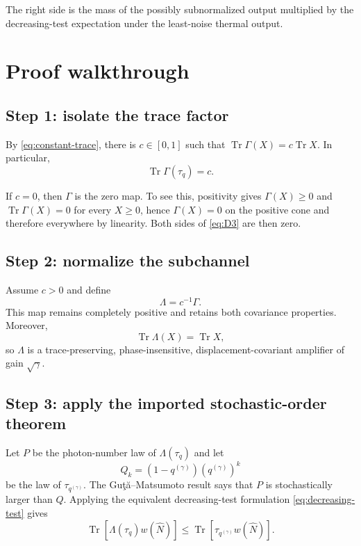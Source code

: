 \documentclass[11pt]{article}
\newcommand{\Tr}{\operatorname{Tr}}
\begin{document}
The right side is the mass of the possibly subnormalized output multiplied
by the decreasing-test expectation under the least-noise thermal output.

\section{Proof walkthrough}

\subsection*{Step 1: isolate the trace factor}

By \eqref{eq:constant-trace}, there is $c\in[0,1]$ such that
$\Tr\Gamma(X)=c\Tr X$.  In particular,
\begin{equation}\label{eq:mass-c}
  \Tr\Gamma(\tau_q)=c.
\end{equation}

If $c=0$, then $\Gamma$ is the zero map.  To see this, positivity gives
$\Gamma(X)\geq0$ and $\Tr\Gamma(X)=0$ for every $X\geq0$, hence
$\Gamma(X)=0$ on the positive cone and therefore everywhere by linearity.
Both sides of \eqref{eq:D3} are then zero.

\subsection*{Step 2: normalize the subchannel}

Assume $c>0$ and define
\[
  \Lambda=c^{-1}\Gamma.
\]
This map remains completely positive and retains both covariance properties.
Moreover,
\[
  \Tr\Lambda(X)=\Tr X,
\]
so $\Lambda$ is a trace-preserving, phase-insensitive,
displacement-covariant amplifier of gain $\sqrt\gamma$.

\subsection*{Step 3: apply the imported stochastic-order theorem}

Let $P$ be the photon-number law of $\Lambda(\tau_q)$ and let
\[
  Q_k=(1-q^{(\gamma)})(q^{(\gamma)})^k
\]
be the law of $\tau_{q^{(\gamma)}}$.  The Gu\c{t}\u{a}--Matsumoto result
says that $P$ is stochastically larger than $Q$.  Applying the equivalent
decreasing-test formulation \eqref{eq:decreasing-test} gives
\begin{equation}\label{eq:normalized-bound}
  \Tr\!\left[\Lambda(\tau_q)w(\widehat N)\right]
  \leq
  \Tr\!\left[\tau_{q^{(\gamma)}}w(\widehat N)\right].
\end{equation}
\end{document}

